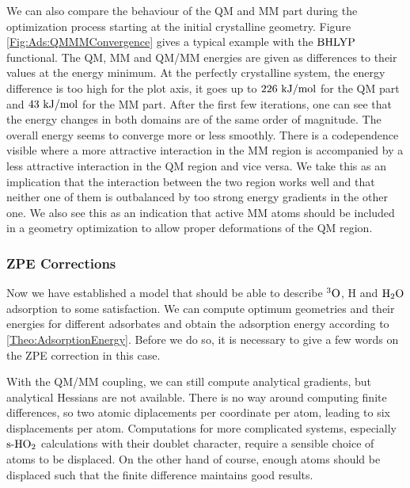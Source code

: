 We can also compare the behaviour of the QM and MM part during the optimization
process starting at the initial crystalline geometry. Figure \ref{Fig:Ads:QMMMConvergence}
gives a typical example with the $\text{BHLYP}$ functional. The QM, MM and
QM/MM energies are given as differences to their values at the energy minimum.
At the perfectly crystalline system, the energy difference is too high for the
plot axis, it goes up to $226~\text {kJ/mol}$ for the QM part and $43~\text {kJ/mol}$ for the MM part. 
After the first few iterations, one can see
that the energy changes in both domains are of the same order of magnitude. The
overall energy seems to converge more or less smoothly. There is a codependence
visible where a more attractive interaction in the MM region is accompanied by
a less attractive interaction in the QM region and vice versa. We take this as
an implication that the interaction between the two region works well and that
neither one of them is outbalanced by too strong energy gradients in the other
one. We also see this as an indication that active MM atoms should be included
in a geometry optimization to allow proper deformations of the QM region.

\subsubsection{ZPE Corrections}
\label{Sec:Ads:ZPE}

Now we have established a model that should be able to describe ${^3\text{O}}$, 
H and $\text H _2 \text O$ adsorption to some satisfaction. We can compute optimum geometries
and their energies for different adsorbates and obtain the adsorption energy
according to \eqref{Theo:AdsorptionEnergy}. Before we do so, it is necessary
to give a few words on the ZPE correction in this case.

With the QM/MM coupling, we can still compute analytical
gradients,%
but analytical Hessians are
not available. There is no way around computing finite differences, so
two atomic diplacements per coordinate per atom, leading to six displacements
per atom. Computations for more complicated systems, especially $\text{s-}\text H \text O_2$
calculations with their doublet character, require a sensible choice of atoms
to be displaced. On the other hand of course, enough atoms should be displaced
such that the finite difference maintains good results.

